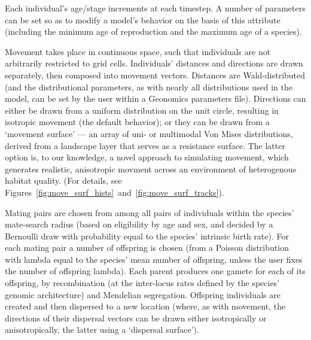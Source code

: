 ﻿\documentclass{article}
\begin{document}
Each individual's age/stage increments at each timestep.
A number of parameters can be set so as to modify a model's behavior on the basis of this attribute
(including the minimum age of reproduction and the maximum age of a species).

Movement takes place in continuous space, such that individuals are not arbitrarily restricted to grid cells.
Individuals' distances and directions are drawn separately, then composed into movement vectors.
Distances are Wald-distributed (and the distributional parameters, as with nearly all distributions
used in the model, can be set by the user within a Geonomics parameters file).
Directions can either be drawn from a uniform distribution on the unit circle, resulting in isotropic movement
(the default behavior); or they can be drawn from a `movement surface' --- an array
of uni- or multimodal Von Mises distributions, derived from a landscape layer that serves as a resistance surface.
The latter option is, to our knowledge, a novel approach to simulating movement,
which generates realistic, anisotropic movment across an environment of heterogenous habitat quality.
(For details, see Figures~\ref{fig:move_surf_hists}~and~\ref{fig:move_surf_tracks}).

Mating pairs are chosen from among all pairs of individuals within the species' mate-search radius
(based on eligibility by age and sex, and decided by a Bernoulli draw with probability equal to the species' intrinsic birth rate). 
For each mating pair a number of offspring is chosen (from a Poisson distribution with
lambda equal to the species' mean number of offspring, unless the user fixes the number of offspring lambda).
Each parent produces one gamete for each of its offspring, by recombination
(at the inter-locus rates defined by the species' genomic architecture) and Mendelian segregation.
Offspring individuals are created and then dispersed to a new location
(where, as with movement, the directions of their dispersal vectors can be drawn either isotropically or
anisotropically, the latter using a `dispersal surface').
\end{document}
